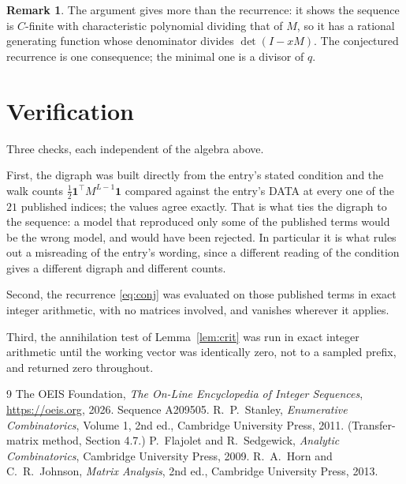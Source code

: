 \documentclass[11pt,a4paper]{article}
\theoremstyle{plain}
\theoremstyle{definition}
\newtheorem{remark}[theorem]{Remark}
\begin{document}
\begin{remark}
The argument gives more than the recurrence: it shows the sequence is $C$-finite with
characteristic polynomial dividing that of $M$, so it has a rational generating function
whose denominator divides $\det(I-xM)$. The conjectured recurrence is one consequence; the
minimal one is a divisor of $q$.
\end{remark}

\section{Verification}

Three checks, each independent of the algebra above.

First, the digraph was built directly from the entry's stated condition and the walk counts
$\tfrac1{2}\mathbf{1}^{\!\top}M^{L-1}\mathbf{1}$ compared against the entry's DATA at
every one of the $21$ published indices; the values agree exactly. That is what ties
the digraph to the sequence: a model that reproduced only some of the published terms would
be the wrong model, and would have been rejected. In particular it is what rules out a
misreading of the entry's wording, since a different reading of the condition gives a
different digraph and different counts.

Second, the recurrence \eqref{eq:conj} was evaluated on those published terms in exact
integer arithmetic, with no matrices involved, and vanishes wherever it applies.

Third, the annihilation test of Lemma~\ref{lem:crit} was run in exact integer arithmetic
until the working vector was identically zero, not to a sampled prefix, and returned zero
throughout.

\begin{thebibliography}{9}
 The OEIS Foundation, \emph{The On-Line Encyclopedia of Integer
Sequences}, \url{https://oeis.org}, 2026. Sequence A209505.
 R.~P.~Stanley, \emph{Enumerative Combinatorics}, Volume 1, 2nd ed.,
Cambridge University Press, 2011. (Transfer-matrix method, Section 4.7.)
 P.~Flajolet and R.~Sedgewick, \emph{Analytic Combinatorics}, Cambridge
University Press, 2009.
 R.~A.~Horn and C.~R.~Johnson, \emph{Matrix Analysis}, 2nd ed., Cambridge
University Press, 2013.
\end{thebibliography}
\end{document}
